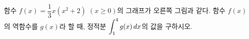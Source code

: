 \noindent\begin{minipage}[t]{0.58\linewidth}\vspace{0pt}\raggedright 함수 $f(x)=\dfrac{1}{3}x(x^2+2)$ $(x\ge 0)$의 그래프가 오른쪽 그림과 같다. 함수 $f(x)$의 역함수를 $g(x)$라 할 때, 정적분 $\displaystyle\int_{1}^{4} g(x)\mkern3mu dx$의 값을 구하시오.\end{minipage}\hfill\begin{minipage}[t]{0.4\linewidth}\vspace{0pt}\centering \resizebox{\ifdim\width>\linewidth\linewidth\else\width\fi}{!}{}\end{minipage}\par
